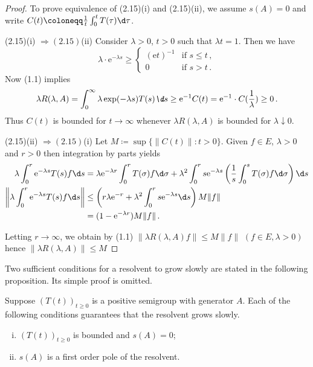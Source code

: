 \begin{proof} 
To prove equivalence of (2.15)(i) and (2.15)(ii), we assume $s(A) = 0$ and write $C(t) \coloneqq \frac{1}{t} \int_{0}^{t} T(\tau) \d\tau$.

(2.15)(i) $\Rightarrow (2.15)$(ii)\quad 
Consider $\lambda > 0$, $t > 0$ such that $\lambda t = 1$. 
Then we have
\[
\lambda \cdot \mathrm{e}^{-\lambda s} \geq 
\begin{cases}
	(\mathrm{e}t)^{-1} & \text{if } s \leq t\,, \\
	0 & \text{if } s > t\,.
\end{cases}
\]
Now (1.1) implies 
\[
\textit{$\lambda R(\lambda,A) = \int_{0}^{\infty} \lambda \exp(-\lambda s)T(s) \d s \geq \mathrm{e}^{-1}C(t) = \mathrm{e}^{-1}\cdot C(\frac{1}{\lambda}) \geq 0$}\,.
\]
Thus $C(t)$ is bounded for $t \to \infty$ whenever $\lambda R(\lambda,A)$ is bounded for $\lambda \downarrow 0$.

(2.15)(ii) $\Rightarrow (2.15)$(i)\quad
 Let $M \coloneqq \sup\{\|C(t)\| : t > 0\}$.
Given $f \in E$, $\lambda > 0$ and $r > 0$ then integration by parts yields
\begin{align*}
	\lambda \int_{0}^{r} \mathrm{e}^{-\lambda s}T(s)f \d s &= \lambda \mathrm{e}^{-\lambda r} \int_{0}^{r} T(\sigma)f \d\sigma + \lambda^{2}\int_{0}^{r} s\mathrm{e}^{-\lambda s}\left(\frac{1}{s}\int_{0}^{s} T(\sigma)f \d\sigma\right)\d s \\
	\left\|\lambda \int_{0}^{r} \mathrm{e}^{-\lambda s}T(s)f \d s\right\| &\leq \left(r\lambda \mathrm{e}^{-r} + \lambda^{2}\int_{0}^{r} s\mathrm{e}^{-\lambda s} \d s\right)M\|f\| \\
	&= (1 - \mathrm{e}^{-\lambda r})M\|f\|\,.
\end{align*}

Letting $r \to \infty$, we obtain by (1.1) $\|\lambda R(\lambda,A)f\| \leq M\|f\|$ $(f \in E, \lambda > 0)$ hence $\|\lambda R(\lambda,A)\| \leq M$
\end{proof}
%
% 
Two sufficient conditions for a resolvent to grow slowly are stated in the following proposition.
Its simple proof is omitted.
\begin{proposition}\label{prop:c3-2.9}
	Suppose $(T(t))_{t\geq 0}$ is a positive semigroup with generator $A$.
	Each of the following conditions guarantees that the resolvent grows slowly.
	\begin{enumerate}[(i)]
		\item 
		$(T(t))_{t\geq 0}$ is bounded and $s(A) = 0$;
	
		\item 
		$s(A)$ is a first order pole of the resolvent.
	\end{enumerate}
\end{proposition}

